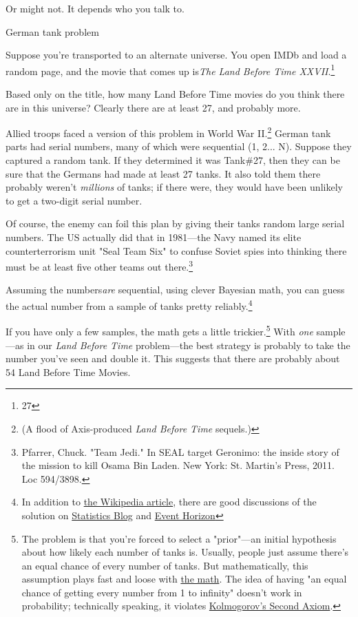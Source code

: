 {{Or might not. It depends who you talk to.}

{German tank problem}

{Suppose you're transported to an alternate universe. You open IMDb and load a random page, and the movie that comes up is\emph{The Land Before Time XXVII}.{\footnote{27} } }

{Based only on the title, how many Land Before Time movies do you think there are in this universe? Clearly there are at least 27, and probably more.}

{Allied troops faced a version of this problem in World War II.{\footnote{(A flood of Axis-produced \emph{Land Before Time} sequels.)} } German tank parts had serial numbers, many of which were sequential (1, 2... N). Suppose they captured a random tank. If they determined it was Tank\#27, then they can be sure that the Germans had made at least 27 tanks. It also told them there probably weren't \emph{millions} of tanks; if there were, they would have been unlikely to get a two-digit serial number.}

{Of course, the enemy can foil this plan by giving their tanks random large serial numbers. The US actually did that in 1981—the Navy named its elite counterterrorism unit "Seal Team Six" to confuse Soviet spies into thinking there must be at least five other teams out there.{\footnote{Pfarrer, Chuck. "Team Jedi." In SEAL target Geronimo: the inside story of the mission to kill Osama Bin Laden. New York: St. Martin's Press, 2011. Loc 594/3898.} } }

{Assuming the numbers\emph{are} sequential, using clever Bayesian math, you can guess the actual number from a sample of tanks pretty reliably.{\footnote{In addition to \href{https://en.wikipedia.org/wiki/German\_tank\_problem}{the Wikipedia article}, there are good discussions of the solution on \href{http://www.statisticsblog.com/tag/german-tank-problem/}{Statistics Blog} and \href{http://cosmic-horizons.blogspot.com.au/2011/12/how-many-tanks.html} {Event Horizon}} } }

{If you have only a few samples, the math gets a little trickier.{\footnote{The problem is that you're forced to select a "prior"—an initial hypothesis about how likely each number of tanks is. Usually, people just assume there's an equal chance of every number of tanks. But mathematically, this assumption plays fast and loose with \href{http://greenteapress.com/thinkstats/html/thinkstats009.html}{the math}. The idea of having "an equal chance of getting every number from 1 to infinity" doesn't work in probability; technically speaking, it violates \href{http://www.econ.umn.edu/undergrad/math/Kolmogorov's\%20Axioms.pdf} {Kolmogorov's Second Axiom}.} } With \emph{one} sample—as in our \emph{Land Before Time} problem—the best strategy is probably to take the number you've seen and double it. This suggests that there are probably about 54 Land Before Time Movies.}

}
